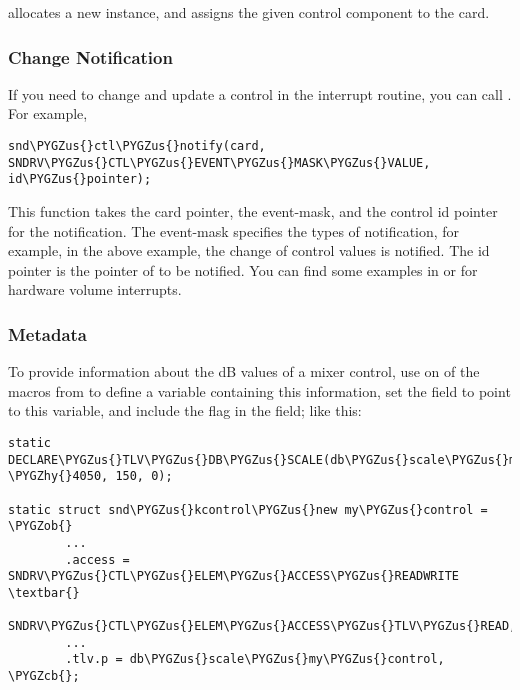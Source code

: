 \documentclass[a4paper,8pt,english]{sphinxmanual}
\def\PYGZus{\char`\_}
\def\PYGZob{\char`\{}
\def\PYGZcb{\char`\}}
\def\PYGZhy{\char`\-}
\begin{document}
 allocates a new  instance, and
 assigns the given control component to the
card.


\subsubsection{Change Notification}
\label{sound/kernel-api/writing-an-alsa-driver:change-notification}
If you need to change and update a control in the interrupt routine, you
can call . For example,

\begin{Verbatim}[commandchars=\\\{\}]
snd\PYGZus{}ctl\PYGZus{}notify(card, SNDRV\PYGZus{}CTL\PYGZus{}EVENT\PYGZus{}MASK\PYGZus{}VALUE, id\PYGZus{}pointer);
\end{Verbatim}

This function takes the card pointer, the event-mask, and the control id
pointer for the notification. The event-mask specifies the types of
notification, for example, in the above example, the change of control
values is notified. The id pointer is the pointer of  to be notified. You can
find some examples in  or  for hardware volume
interrupts.


\subsubsection{Metadata}
\label{sound/kernel-api/writing-an-alsa-driver:metadata}
To provide information about the dB values of a mixer control, use on of
the  macros from  to define a
variable containing this information, set the  field to point to
this variable, and include the  flag
in the  field; like this:

\begin{Verbatim}[commandchars=\\\{\}]
static DECLARE\PYGZus{}TLV\PYGZus{}DB\PYGZus{}SCALE(db\PYGZus{}scale\PYGZus{}my\PYGZus{}control, \PYGZhy{}4050, 150, 0);

static struct snd\PYGZus{}kcontrol\PYGZus{}new my\PYGZus{}control = \PYGZob{}
        ...
        .access = SNDRV\PYGZus{}CTL\PYGZus{}ELEM\PYGZus{}ACCESS\PYGZus{}READWRITE \textbar{}
                  SNDRV\PYGZus{}CTL\PYGZus{}ELEM\PYGZus{}ACCESS\PYGZus{}TLV\PYGZus{}READ,
        ...
        .tlv.p = db\PYGZus{}scale\PYGZus{}my\PYGZus{}control,
\PYGZcb{};
\end{Verbatim}
\end{document}
